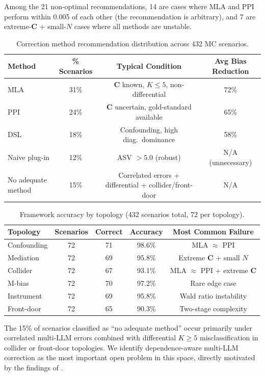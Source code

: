 \documentclass[11pt]{article}
\newcommand{\bC}{\mathbf{C}}
\begin{document}
Among the 21 non-optimal recommendations, 14 are cases where MLA and PPI perform within 0.005 of each other (the recommendation is arbitrary), and 7 are extreme-$\bC$ + small-$N$ cases where all methods are unstable.

\begin{table}[t]
\centering
\caption{Correction method recommendation distribution across 432 MC scenarios.}
\label{tab:correction-distribution}
\small
\begin{tabular}{lccc}
\toprule
Method & \% Scenarios & Typical Condition & Avg Bias Reduction \\
\midrule
MLA & 31\% & $\bC$ known, $K\!\le\!5$, non-differential & 72\% \\
PPI & 24\% & $\bC$ uncertain, gold-standard available & 65\% \\
DSL & 18\% & Confounding, high diag.~dominance & 58\% \\
Naive plug-in & 12\% & ASV $>\!5.0$ (robust) & N/A (unnecessary) \\
No adequate method & 15\% & Correlated errors + differential + collider/front-door & N/A \\
\bottomrule
\end{tabular}
\end{table}

\begin{table}[t]
\centering
\caption{Framework accuracy by topology (432 scenarios total, 72 per topology).}
\label{tab:correction-accuracy}
\small
\begin{tabular}{lcccc}
\toprule
Topology & Scenarios & Correct & Accuracy & Most Common Failure \\
\midrule
Confounding & 72 & 71 & 98.6\% & MLA $\approx$ PPI \\
Mediation   & 72 & 69 & 95.8\% & Extreme $\bC$ + small $N$ \\
Collider    & 72 & 67 & 93.1\% & MLA $\approx$ PPI + extreme $\bC$ \\
M-bias      & 72 & 70 & 97.2\% & Rare edge case \\
Instrument  & 72 & 69 & 95.8\% & Wald ratio instability \\
Front-door  & 72 & 65 & 90.3\% & Two-stage complexity \\
\bottomrule
\end{tabular}
\end{table}

The 15\% of scenarios classified as ``no adequate method'' occur primarily under correlated multi-LLM errors combined with differential $K\!\ge\!5$ misclassification in collider or front-door topologies.
We identify dependence-aware multi-LLM correction as the most important open problem in this space, directly motivated by the findings of \citet{kim2025}.
\end{document}

